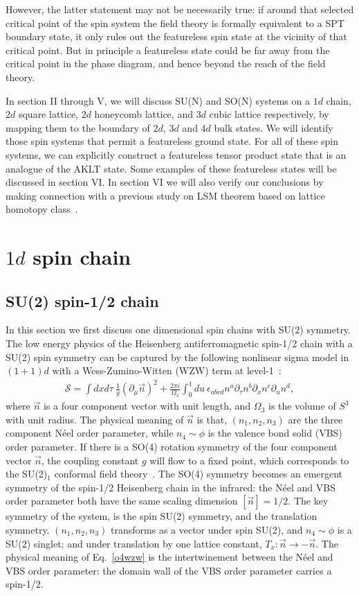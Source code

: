 \documentclass[aps,prb,twocolumn,superscriptaddress,showpacs]{revtex4}
\newcommand{\beqn}{\begin{eqnarray}}
\newcommand{\eeqn}{\end{eqnarray}}
\begin{document}
However, the latter statement may not be necessarily true: if
around that selected critical point of the spin system the field
theory is formally equivalent to a SPT boundary state, it only
rules out the featureless spin state at the vicinity of that
critical point. But in principle a featureless state could be far
away from the critical point in the phase diagram, and hence
beyond the reach of the field theory.

In section II through V, we will discuss SU(N) and SO(N) systems
on a $1d$ chain, $2d$ square lattice, $2d$ honeycomb lattice, and
$3d$ cubic lattice respectively, by mapping them to the boundary
of $2d$, $3d$ and $4d$ bulk states. We will identify those spin
systems that permit a featureless ground state. For all of these
spin systems, we can explicitly construct a featureless tensor
product state that is an analogue of the AKLT state. Some examples
of these featureless states will be discussed in section VI. In
section VI we will also verify our conclusions by making
connection with a previous study on LSM theorem based on lattice
homotopy class~\cite{Po2017}.

\section{$1d$ spin chain}

\subsection{SU(2) spin-1/2 chain}

In this section we first discuss one dimensional spin chains with
SU(2) symmetry. The low energy physics of the Heisenberg
antiferromagnetic spin-1/2 chain with a SU(2) spin symmetry can be
captured by the following nonlinear sigma model in $(1+1)d$ with a
Wess-Zumino-Witten (WZW) term at level-1~\cite{affleck1986}: \beqn
\mathcal{S} = \int dx d\tau \ \frac{1}{g}(\partial_\mu \vec{n})^2
+ \frac{2\pi i}{\Omega_3} \int_0^1 du \ \epsilon_{abcd} n^a
\partial_\tau n^b
\partial_x n^c
\partial_u n^d, \label{o4wzw} \eeqn where $\vec{n}$ is a four component vector
with unit length, and $\Omega_3$ is the volume of $S^3$ with unit
radius. The physical meaning of $\vec{n}$ is that, $(n_1, n_2,
n_3)$ are the three component N\'{e}el order parameter, while $n_4
\sim \phi$ is the valence bond solid (VBS) order parameter. If
there is a SO(4) rotation symmetry of the four component vector
$\vec{n}$, the coupling constant $g$ will flow to a fixed point,
which corresponds to the SU(2)$_1$ conformal field
theory~\cite{Witten1984,KnizhnikZamolodchikov1984}. The SO(4)
symmetry becomes an emergent symmetry of the spin-1/2 Heisenberg
chain in the infrared: the N\'{e}el and VBS order parameter both
have the same scaling dimension $[\vec{n}] = 1/2$. The key
symmetry of the system, is the spin SU(2) symmetry, and the
translation symmetry. $(n_1, n_2, n_3)$ transforms as a vector
under spin SU(2), and $n_4 \sim \phi$ is a SU(2) singlet; and
under translation by one lattice constant, $T_x: \vec{n}
\rightarrow - \vec{n}$. The physical meaning of Eq.~\ref{o4wzw} is
the intertwinement between the N\'{e}el and VBS order parameter:
the domain wall of the VBS order parameter carries a spin-1/2.
\end{document}
